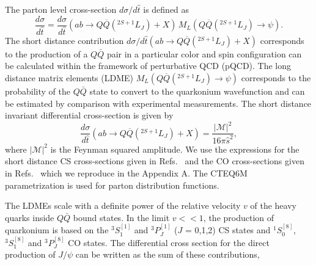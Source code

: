 \documentclass[12pt,a4paper,final]{iopart}
\newcommand{\barQ}{{\bar{Q}}}
\begin{document}
 The parton level cross-section $d\sigma/d\hat{t}$ is defined as~\cite{Bodwin:1994jh}
\begin{equation}
\frac{d\sigma}{d\hat t} = \frac{d\sigma}{d\hat t}(ab\rightarrow Q\overline{Q}(^{2S+1}L_{J})+X)
               \, M_{L}(Q\overline{Q}(^{2S+1}L_{J})\rightarrow\psi).
\end{equation}
  The short distance contribution 
$d\sigma/d\hat t (ab\rightarrow Q\overline{Q}(^{2S+1}L_{J})+X)$ 
corresponds to the production of a $Q\barQ$ pair in a particular
color and spin configuration can be calculated within the framework of 
perturbative QCD (pQCD). The long distance matrix elements (LDME) 
$M_{L}(Q\overline{Q}(^{2S+1}L_{J})\rightarrow\psi)$ corresponds to the 
probability of the $Q\barQ$ state to convert to the quarkonium wavefunction
and can be estimated by comparison with experimental measurements. 
 The short distance invariant differential cross-section is given by
\begin{equation}
  \frac{d\sigma}{d\hat t}(ab\rightarrow Q\overline{Q}(^{2S+1}L_{J})+X) 
                = \frac{|\mathcal{M}|^2}{16\pi{\hat s}^2},
\end{equation}
where $|\mathcal{M}|^2$ is the Feynman squared amplitude. We use the expressions for the 
short distance CS cross-sections given in 
Refs.~\cite{Baier:1983va,Humpert:1986cy,Gastmans:1987be} and the CO 
cross-sections given in Refs.~\cite{Cho:1995vh,Cho:1995ce,Braaten:2000cm} which
we reproduce in the Appendix A. 
  The CTEQ6M~\cite{Lai:2010vv} parametrization is used for parton 
distribution functions. 

   The LDMEs scale with a definite power of the relative velocity $v$ of the 
heavy quarks inside $Q\bar Q$ bound states. In the limit $v<<1$, the production of 
quarkonium is based on the $^3S_1^{[1]}$ and $^3P_J^{[1]}$ ($J$ = 0,1,2) CS states 
and $^1S_0^{[8]}$, $^3S_1^{[8]}$ and $^3P_J^{[8]}$ CO states. The differential 
cross section for the direct production of $J/\psi$ can be written as the 
sum of these contributions,

\end{document}
